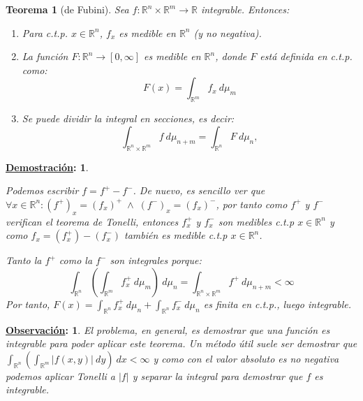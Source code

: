 \documentclass[10pt,a4paper,openright]{book}
\theoremstyle{break}
\newtheorem*{theo}{Teorema}
\newtheorem*{demo}{\underline{Demostración}:}
\newtheorem*{obs}{\underline{Observación}:}
\newcommand{\dif}[1]{\ d#1}
\begin{document}
\begin{theo}[de Fubini]
Sea $f: \mathbb{R}^n \times \mathbb{R}^m \rightarrow \mathbb{R}$ integrable. Entonces: 
\begin{enumerate}
\item Para c.t.p. $x \in \mathbb{R}^n$, $f_x$ es medible en $\mathbb{R}^n$ (y no negativa).
\item La función $F: \mathbb{R}^n \rightarrow \left[0, \infty\right]$ es medible en $\mathbb{R}^n$, donde $F$ está definida en c.t.p. como:
$$F \left(x\right) = \int_{\mathbb{R}^m} f_x \dif{\mu}_m$$

\item Se puede dividir la integral en secciones, es decir:
$$\int_{\mathbb{R}^n \times \mathbb{R}^m} f \dif{\mu}_{n+m} = \int_{\mathbb{R}^n} F \dif{\mu}_n,$$
\end{enumerate}
\end{theo}
\begin{demo}
\begin{enumerate}
Podemos escribir $f = f^+ - f^-$. De nuevo, es sencillo ver que $\forall x \in \mathbb{R}^n : \left(f^+\right)_x = \left(f_x\right)^+ \; \land \; \left(f^-\right)_x = \left(f_x\right)^-$, por tanto como $f^+$ y $f^-$ verifican el teorema de Tonelli, entonces $f^+_x $ y $f^-_x$ son medibles c.t.p $x \in \mathbb{R}^n$ y como $f_x = \left(f^+_x\right) - \left(f^-_x\right)$ también es medible c.t.p $x \in \mathbb{R}^n$.

Tanto la $f^+$ como la $f^-$ son integrales porque:
 $$\int_{\mathbb{R}^n} \left(\int_{\mathbb{R}^m} f^+_x \dif{\mu_m} \right) \dif{\mu_n} = \int_{\mathbb{R}^n \times \mathbb{R}^m} f^+ \dif{\mu_{n+m}} < \infty$$
Por tanto, $F \left(x\right) = \int_{\mathbb{R}^n} f^+_x \dif{\mu_n} + \int_{\mathbb{R}^n} f^-_x \dif{\mu_n}$ es finita en c.t.p., luego integrable.
\end{enumerate}
\end{demo}

\begin{obs}
El problema, en general, es demostrar que una función es integrable para poder aplicar este teorema. Un método útil suele ser demostrar que $\int_{\mathbb{R}^n} \left(\int_{\mathbb{R}^m} \vert f \left(x, y\right) \vert \dif{y} \right) \dif{x} < \infty$ y como con el valor absoluto es no negativa podemos aplicar Tonelli a $\vert f\vert$ y separar la integral para demostrar que $f$ es integrable.
\end{obs}
\end{document}
